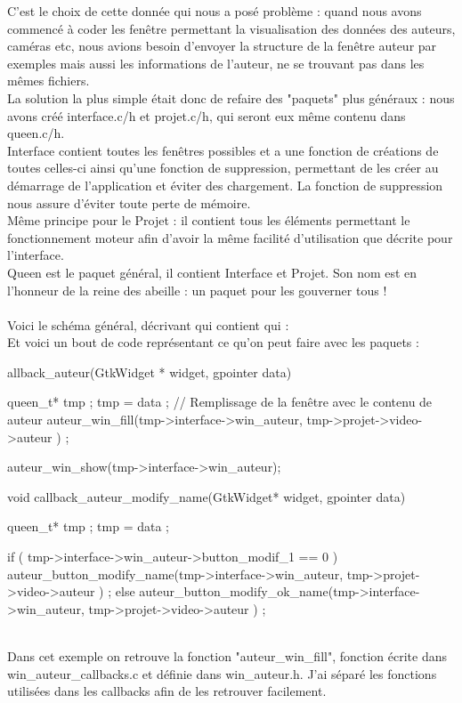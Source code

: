 \documentclass[11pt,french,a4paper]{report}
\begin{document}
C'est le choix de cette donnée qui nous a posé problème : quand nous avons commencé
à coder les fenêtre permettant la visualisation des données des auteurs, caméras etc, nous avions besoin d'envoyer la structure
de la fenêtre auteur par exemples mais aussi les informations de l'auteur, ne se trouvant pas dans les mêmes fichiers.  \\
La solution la plus simple était donc de refaire des "paquets" plus généraux : nous avons créé interface.c/h et projet.c/h, qui seront eux
même contenu dans queen.c/h. \\
Interface contient toutes les fenêtres possibles et a une fonction de créations de toutes celles-ci ainsi qu'une fonction de suppression, 
permettant de les créer au démarrage de l'application et éviter des chargement. La fonction de suppression nous assure d'éviter toute perte de mémoire.\\
Même principe pour le Projet : il contient tous les éléments permettant le fonctionnement moteur afin d'avoir la même facilité
d'utilisation que décrite pour l'interface. \\
Queen est le paquet général, il contient Interface et Projet. Son nom est en l'honneur de la reine des abeille : 
un paquet pour les gouverner tous ! \\
\\
Voici le schéma général, décrivant qui contient qui :%
\\
Et voici un bout de code représentant ce qu'on peut faire avec les paquets : 

allback\_auteur(GtkWidget * widget, gpointer data)
 {
     queen\_t* tmp ;
     tmp = data ;
     // Remplissage de la fenêtre avec le contenu de auteur
     auteur\_win\_fill(tmp->interface->win\_auteur, tmp->projet->video->auteur ) ;

     auteur\_win\_show(tmp->interface->win\_auteur);
 }
 void callback\_auteur\_modify\_name(GtkWidget* widget, gpointer data) {
         queen\_t* tmp ;
         tmp = data ;

         if ( tmp->interface->win\_auteur->button\_modif\_1 == 0 )
         auteur\_button\_modify\_name(tmp->interface->win\_auteur, tmp->projet->video->auteur ) ;
         else
         auteur\_button\_modify\_ok\_name(tmp->interface->win\_auteur, tmp->projet->video->auteur ) ;
   }

\\
Dans cet exemple on retrouve la fonction "auteur\_win\_fill", fonction écrite dans win\_auteur\_callbacks.c et définie
dans win\_auteur.h. J'ai séparé les fonctions utilisées dans les callbacks afin de les retrouver facilement. \\
\end{document}
